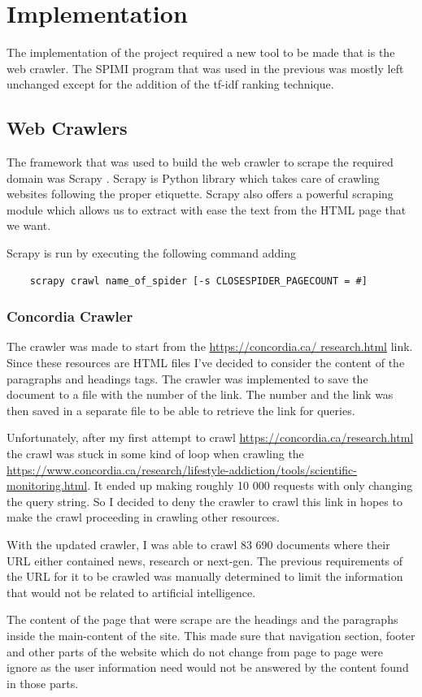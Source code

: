 \chapter{Implementation}

The implementation of the project required a new tool to be made that is the web crawler. The SPIMI program that was used in the previous was mostly left unchanged except for the addition of the tf-idf ranking technique.

\section{Web Crawlers}

\par The framework that was used to build the web crawler to scrape the required domain was Scrapy \cite{scrapy}. Scrapy is Python library which takes care of crawling websites following the proper etiquette. Scrapy also offers a powerful scraping module which allows us to extract with ease the text from the HTML page that we want.

\par Scrapy is run by executing the following command adding 
\begin{verbatim}
    scrapy crawl name_of_spider [-s CLOSESPIDER_PAGECOUNT = #]
\end{verbatim}

\subsection{Concordia Crawler}

\par The crawler was made to start from the \url{https://concordia.ca/ research.html} link. Since these resources are HTML files I've decided to consider the content of the paragraphs and headings tags. The crawler was implemented to save the document to a file with the number of the link. The number and the link was then saved in a separate file to be able to retrieve the link for queries.
\par Unfortunately, after my first attempt to crawl \url{https://concordia.ca/research.html} the crawl was stuck in some kind of loop when crawling the \url{https://www.concordia.ca/research/lifestyle-addiction/tools/scientific-monitoring.html}. It ended up making roughly 10 000 requests with only changing the query string. So I decided to deny the crawler to crawl this link in hopes to make the crawl proceeding in crawling other resources.
\par With the updated crawler, I was able to crawl 83 690 documents where their URL either contained news, research or next-gen. The previous requirements of the URL for it to be crawled was manually determined to limit the information that would not be related to artificial intelligence.
\par The content of the page that were scrape are the headings and the paragraphs inside the main-content of the site. This made sure that navigation section, footer and other parts of the website which do not change from page to page were ignore as the user information need would not be answered by the content found in those parts.

